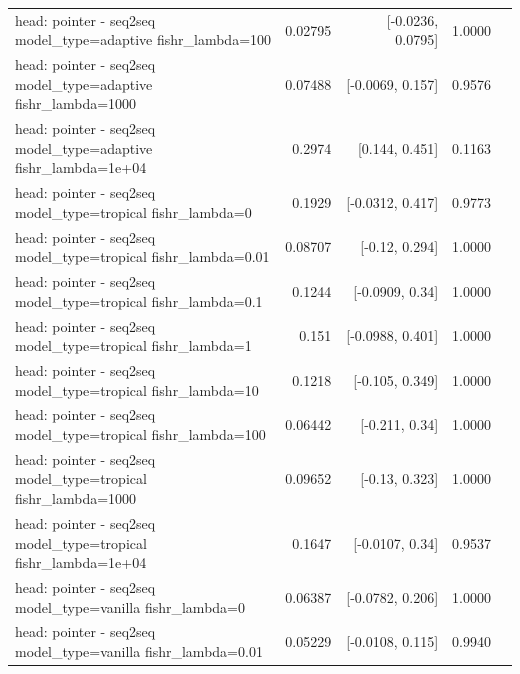 \documentclass[10pt]{article}
\makeatletter
\newcommand{\stackcell}[1]{\begin{tabular}[t]{@{}l@{}}#1\end{tabular}}
\makeatother
\begin{document}
{\begin{longtable}{lrrrl}
\stackcell{head: pointer - seq2seq\\\footnotesize model\_type=adaptive fishr\_lambda=100 } & 0.02795 & [-0.0236, 0.0795] & 1.0000 & \\
\stackcell{head: pointer - seq2seq\\\footnotesize model\_type=adaptive fishr\_lambda=1000 } & 0.07488 & [-0.0069, 0.157] & 0.9576 & \\
\stackcell{head: pointer - seq2seq\\\footnotesize model\_type=adaptive fishr\_lambda=1e+04 } & 0.2974 & [0.144, 0.451] & 0.1163 & \\
\stackcell{head: pointer - seq2seq\\\footnotesize model\_type=tropical fishr\_lambda=0 } & 0.1929 & [-0.0312, 0.417] & 0.9773 & \\
\stackcell{head: pointer - seq2seq\\\footnotesize model\_type=tropical fishr\_lambda=0.01 } & 0.08707 & [-0.12, 0.294] & 1.0000 & \\
\stackcell{head: pointer - seq2seq\\\footnotesize model\_type=tropical fishr\_lambda=0.1 } & 0.1244 & [-0.0909, 0.34] & 1.0000 & \\
\stackcell{head: pointer - seq2seq\\\footnotesize model\_type=tropical fishr\_lambda=1 } & 0.151 & [-0.0988, 0.401] & 1.0000 & \\
\stackcell{head: pointer - seq2seq\\\footnotesize model\_type=tropical fishr\_lambda=10 } & 0.1218 & [-0.105, 0.349] & 1.0000 & \\
\stackcell{head: pointer - seq2seq\\\footnotesize model\_type=tropical fishr\_lambda=100 } & 0.06442 & [-0.211, 0.34] & 1.0000 & \\
\stackcell{head: pointer - seq2seq\\\footnotesize model\_type=tropical fishr\_lambda=1000 } & 0.09652 & [-0.13, 0.323] & 1.0000 & \\
\stackcell{head: pointer - seq2seq\\\footnotesize model\_type=tropical fishr\_lambda=1e+04 } & 0.1647 & [-0.0107, 0.34] & 0.9537 & \\
\stackcell{head: pointer - seq2seq\\\footnotesize model\_type=vanilla fishr\_lambda=0 } & 0.06387 & [-0.0782, 0.206] & 1.0000 & \\
\stackcell{head: pointer - seq2seq\\\footnotesize model\_type=vanilla fishr\_lambda=0.01 } & 0.05229 & [-0.0108, 0.115] & 0.9940 & \\

\end{longtable}}
\end{document}
